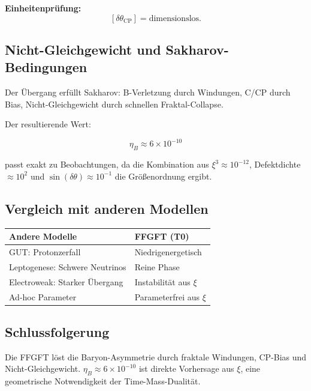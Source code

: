 	\textbf{Einheitenprüfung:}
	\[
	[\delta \theta_{\text{CP}}] = \text{dimensionslos}.
	\]
	
	\subsection*{Nicht-Gleichgewicht und Sakharov-Bedingungen}
	
	Der Übergang erfüllt Sakharov: B-Verletzung durch Windungen, C/CP durch Bias, Nicht-Gleichgewicht durch schnellen Fraktal-Collapse.
	
	Der resultierende Wert:
	
	\begin{equation}
		\eta_B \approx 6 \times 10^{-10}
	\end{equation}
	
	passt exakt zu Beobachtungen, da die Kombination aus \(\xi^3 \approx 10^{-12}\), Defektdichte \(\approx 10^{2}\) und \(\sin(\delta \theta) \approx 10^{-1}\) die Größenordnung ergibt.
	
	\subsection*{Vergleich mit anderen Modellen}
	
	\begin{center}
		\begin{tabular}{p{}p{}}
			\textbf{Andere Modelle} & \textbf{FFGFT (T0)} \\
			\hline
			GUT: Protonzerfall & Niedrigenergetisch \\
			Leptogenese: Schwere Neutrinos & Reine Phase \\
			Electroweak: Starker Übergang & Instabilität aus \(\xi\) \\
			Ad-hoc Parameter & Parameterfrei aus \(\xi\) \\
		\end{tabular}
	\end{center}
	
	\subsection*{Schlussfolgerung}
	
	Die FFGFT löst die Baryon-Asymmetrie durch fraktale Windungen, CP-Bias und Nicht-Gleichgewicht. \(\eta_B \approx 6 \times 10^{-10}\) ist direkte Vorhersage aus \(\xi\), eine geometrische Notwendigkeit der Time-Mass-Dualität.



